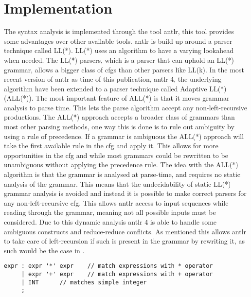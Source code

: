 \section{Implementation}\label{sec:ANTLR}
The syntax analysis is implemented through the tool \acrfull{antlr}, this tool provides some advantages over other available tools.
\acrshort{antlr} is build up around a parser technique called LL(*).
LL(*) uses an algorithm to have a varying lookahead when needed.
The LL(*) parsers, which is a parser that can uphold an LL(*) grammar, allows a bigger class of \acrshort{cfg}s than other parsers like LL(k).
In the most recent version of \acrshort{antlr} as time of this publication, \acrshort{antlr} 4, the underlying algorithm have been extended to a parser technique called Adaptive LL(*) (ALL(*)).
The most important feature of ALL(*) is that it moves grammar analysis to parse time. 
This lets the parse algorithm accept any non-left-recursive productions.
The ALL(*) approach accepts a broader class of grammars than most other parsing methods, one way this is done is to rule out ambiguity by using a rule of precedence.
If a grammar is ambiguous the ALL(*) approach will take the first  available rule in the \acrshort{cfg} and apply it.
This allows for more opportunities in the \acrshort{cfg} and while most grammars could be rewritten to be unambiguous without applying the precedence rule.
The idea with the ALL(*) algorithm is that the grammar is analysed  at parse-time, and requires no static analysis of the grammar. 
This means that the undecidability of static LL(*) grammar analysis is avoided and instead it is possible to make correct parsers for any non-left-recursive \acrshort{cfg}.
This allows \acrshort{antlr} access to input sequences while reading through the grammar, meaning not all possible inputs must be considered.
Due to this dynamic analysis \acrshort{antlr} 4 is able to handle some ambiguous constructs and reduce-reduce conflicts.
As mentioned this allows \acrshort{antlr} to take care of left-recursion if such is present in the grammar by rewriting it, as such would be the case in .

\begin{lstlisting}[caption=An ambiguous rule for expr,frame=tlrb,label={lst:amb}]
expr : expr '*' expr 	// match expressions with * operator
     | expr '+' expr 	// match expressions with + operator
     | INT 		// matches simple integer
     ;
\end{lstlisting}

